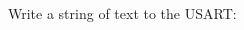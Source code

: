 \begin{DoxyEnumerate}
\item Write a string of text to the U\+S\+A\+RT\+:
\begin{DoxyItemize}
\item 
\begin{DoxyCode}{0}
\end{DoxyCode}
 
\end{DoxyItemize}
\end{DoxyEnumerate}
